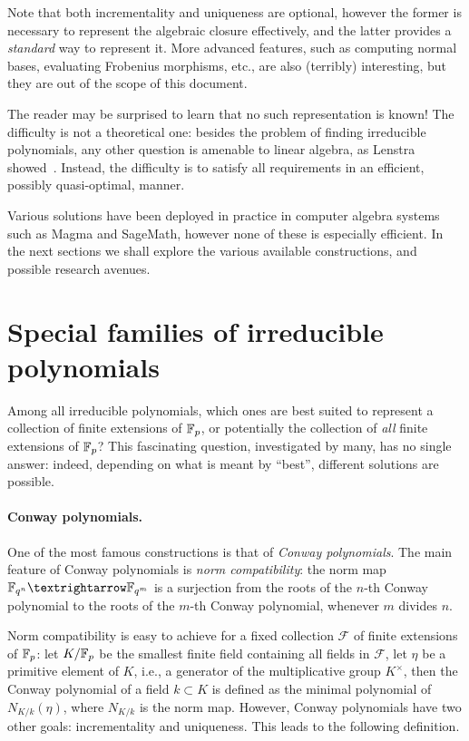 \documentclass{report}
\theoremstyle{plain}
\theoremstyle{definition}
\begin{document}
Note that both incrementality and uniqueness are optional, however the
former is necessary to represent the algebraic closure effectively,
and the latter provides a \emph{standard} way to represent it. %
More advanced features, such as computing normal bases, evaluating
Frobenius morphisms, etc., are also (terribly) interesting, but they
are out of the scope of this document. %

The reader may be surprised to learn that no such representation is
known! %
The difficulty is not a theoretical one: besides the problem of
finding irreducible polynomials, any other question is amenable to
linear algebra, as Lenstra showed~\cite{LenstraJr91}. %
Instead, the difficulty is to satisfy all requirements in an
efficient, possibly quasi-optimal, manner. %

Various solutions have been deployed in practice in computer algebra
systems such as Magma and SageMath, however none of these is
especially efficient. %
In the next sections we shall explore the various available
constructions, and possible research avenues. %


\section{Special families of irreducible polynomials}
\label{sec:spec-famil-irred}

Among all irreducible polynomials, which ones are best suited to
represent a collection of finite extensions of $\mathbb{F}_p$, or potentially
the collection of \emph{all} finite extensions of $\mathbb{F}_p$? %
This fascinating question, investigated by many, has no single answer:
indeed, depending on what is meant by ``best'', different solutions
are possible. %

\paragraph{Conway polynomials.}
One of the most famous constructions is that of \emph{Conway
  polynomials}. %
The main feature of Conway polynomials is \emph{norm compatibility}:
the norm map $\F_{q^n}→\F_{q^m}$ is a surjection from the roots of the
$n$-th Conway polynomial to the roots of the $m$-th Conway polynomial,
whenever $m$ divides $n$. %

Norm compatibility is easy to achieve for a fixed collection
$\mathcal{F}$ of finite extensions of $\mathbb{F}_p$: let $K/\mathbb{F}_p$ be the
smallest finite field containing all fields in $\mathcal{F}$, let $η$
be a primitive element of $K$, i.e., a generator of the multiplicative
group $K^×$, then the Conway polynomial of a field $k⊂K$ is defined as
the minimal polynomial of $N_{K/k}(η)$, where $N_{K/k}$ is the norm
map. %
However, Conway polynomials have two other goals: incrementality and
uniqueness. %
This leads to the following definition.
\end{document}
